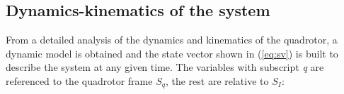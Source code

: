 \documentclass[conference]{IEEEtran}
\newcommand{\refp}[1]{(\ref{#1})}
\begin{document}
\subsection{Dynamics-kinematics of the system}
\label{sec:modelo-dyn-kin}
From a detailed analysis of the dynamics and kinematics of the quadrotor, a dynamic model is obtained and the state vector shown in \refp{eq:sv} is built to describe the system at any given time. The variables with subscript \textit{q} are referenced to the quadrotor frame $S_q$, the rest are relative to $S_I$:
\end{document}
